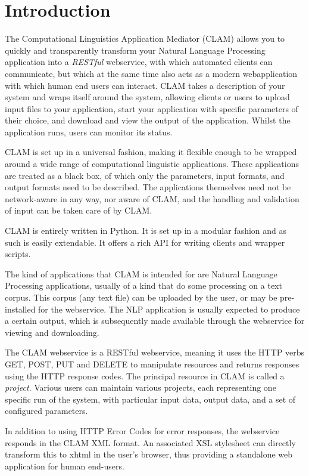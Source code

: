 \documentclass[a4paper,12pt]{report}
\begin{document}
\chapter{Introduction} 

The Computational Linguistics Application Mediator (CLAM) allows you to quickly
and transparently transform your Natural Language Processing application into a
\emph{RESTful}\/ webservice, with which automated clients can communicate, but
which at the same time also acts as a modern webapplication with which human
end users can interact. CLAM takes a description of your system and wraps
itself around the system, allowing clients or users to upload input files to
your application, start your application with specific parameters of their
choice, and download and view the output of the application. Whilst the
application runs, users can monitor its status.

CLAM is set up in a universal fashion, making it flexible enough to be wrapped
around a wide range of computational linguistic applications. These
applications are treated as a black box, of which only the parameters, input
formats, and output formats need to be described. The applications themselves
need not be network-aware in any way, nor aware of CLAM, and the handling and
validation of input can be taken care of by CLAM.

CLAM is entirely written in Python. It is set up in a modular fashion and as
such is easily extendable. It offers a rich API for writing clients and wrapper
scripts.

The kind of applications that CLAM is intended for are Natural Language
Processing applications, usually of a kind that do some processing on a text
corpus. This corpus (any text file) can be uploaded by the user, or may be
pre-installed for the webservice. The NLP application is usually expected to
produce a certain output, which is subsequently made available through the
webservice for viewing and downloading.

The CLAM webservice is a RESTful webservice\cite{REST}, meaning it uses the HTTP verbs
GET, POST, PUT and DELETE to manipulate resources and returns responses using
the HTTP response codes. The principal resource in CLAM is called a
\emph{project}. Various users can maintain various projects, each representing
one specific run of the system, with particular input data, output data, and a
set of configured parameters.

In addition to using HTTP Error Codes for error responses, the webservice
responds in the CLAM XML format. An associated XSL stylesheet \cite{XSLT} can directly
transform this to xhtml in the user's browser, thus providing a standalone web
application for human end-users. 
\end{document}
